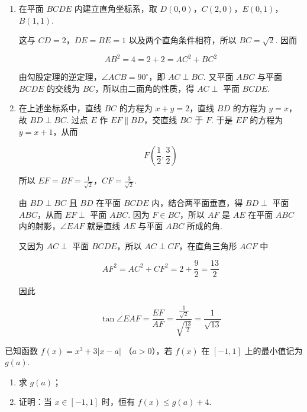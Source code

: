 \begin{solution}
\begin{enumerate}
\item 在平面 \(BCDE\) 内建立直角坐标系，取 \(D(0,0)\)，\(C(2,0)\)，\(E(0,1)\)，\(B(1,1)\).

这与 \(CD=2\)，\(DE=BE=1\) 以及两个直角条件相符，所以 \(BC=\sqrt{2}\). 因而

\[
AB^2=4=2+2=AC^2+BC^2
\]

由勾股定理的逆定理，\(\angle ACB=90^\circ\)，即 \(AC\perp BC\). 又平面 \(ABC\) 与平面 \(BCDE\) 的交线为 \(BC\)，所以由二面角的性质，得 \(AC\perp\) 平面 \(BCDE\).

\item 在上述坐标系中，直线 \(BC\) 的方程为 \(x+y=2\)，直线 \(BD\) 的方程为 \(y=x\)，故 \(BD\perp BC\). 过点 \(E\) 作 \(EF\parallel BD\)，交直线 \(BC\) 于 \(F\). 于是 \(EF\) 的方程为 \(y=x+1\)，从而

\[
F\left(\frac{1}{2},\frac{3}{2}\right)
\]

所以 \(EF=BF=\frac{1}{\sqrt{2}}\)，\(CF=\frac{3}{\sqrt{2}}\).

由 \(BD\perp BC\) 且 \(BD\) 在平面 \(BCDE\) 内，结合两平面垂直，得 \(BD\perp\) 平面 \(ABC\)，从而 \(EF\perp\) 平面 \(ABC\). 因为 \(F\in BC\)，所以 \(AF\) 是 \(AE\) 在平面 \(ABC\) 内的射影，\(\angle EAF\) 就是直线 \(AE\) 与平面 \(ABC\) 所成的角.

又因为 \(AC\perp\) 平面 \(BCDE\)，所以 \(AC\perp CF\)，在直角三角形 \(ACF\) 中

\[
AF^2=AC^2+CF^2=2+\frac{9}{2}=\frac{13}{2}
\]

因此

\[
\tan\angle EAF=\frac{EF}{AF}=\frac{\frac{1}{\sqrt{2}}}{\sqrt{\frac{13}{2}}}=\frac{1}{\sqrt{13}}
\]
\end{enumerate}
\end{solution}

\begin{problem}
已知函数 \( f(x) = x^3 + 3|x - a| \) （\( a > 0 \)），若 \( f(x) \) 在 \([-1, 1]\) 上的最小值记为 \( g(a) \).

\begin{enumerate}
\item 求 \(g(a)\)；
\item 证明：当 \(x \in [-1, 1]\) 时，恒有 \(f(x) \leqslant g(a) + 4\).
\end{enumerate}
\end{problem}

